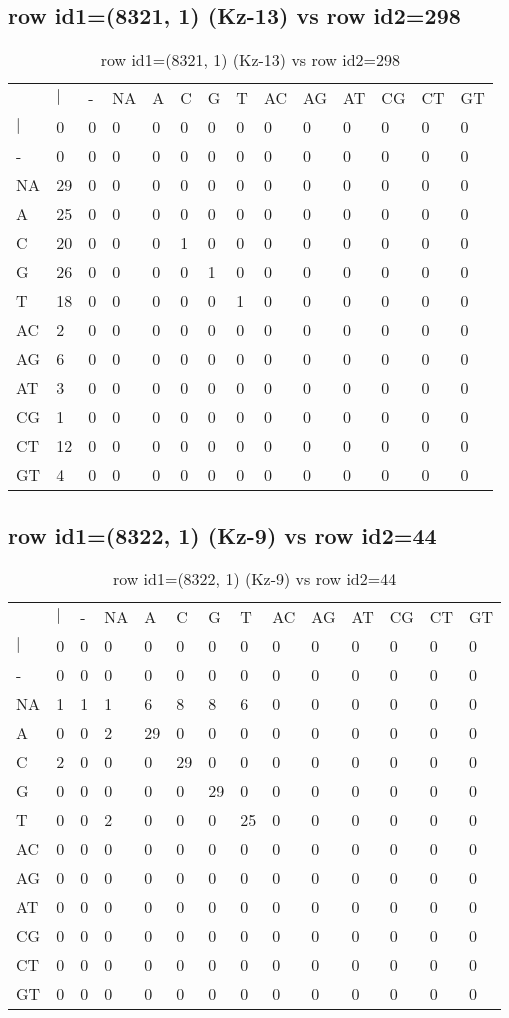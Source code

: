\subsection{row id1=(8321, 1) (Kz-13) vs row id2=298}
\begin{center}
\begin{longtable}{|l|l|l|l|l|l|l|l|l|l|l|l|l|l|}
\caption{row id1=(8321, 1) (Kz-13) vs row id2=298} \label{table_dm320}\\
\hline
\\
\hline
&$|$&-&NA&A&C&G&T&AC&AG&AT&CG&CT&GT\\
$|$&0&0&0&0&0&0&0&0&0&0&0&0&0\\
-&0&0&0&0&0&0&0&0&0&0&0&0&0\\
NA&29&0&0&0&0&0&0&0&0&0&0&0&0\\
A&25&0&0&0&0&0&0&0&0&0&0&0&0\\
C&20&0&0&0&1&0&0&0&0&0&0&0&0\\
G&26&0&0&0&0&1&0&0&0&0&0&0&0\\
T&18&0&0&0&0&0&1&0&0&0&0&0&0\\
AC&2&0&0&0&0&0&0&0&0&0&0&0&0\\
AG&6&0&0&0&0&0&0&0&0&0&0&0&0\\
AT&3&0&0&0&0&0&0&0&0&0&0&0&0\\
CG&1&0&0&0&0&0&0&0&0&0&0&0&0\\
CT&12&0&0&0&0&0&0&0&0&0&0&0&0\\
GT&4&0&0&0&0&0&0&0&0&0&0&0&0\\
\hline
\end{longtable}
\end{center}

\subsection{row id1=(8322, 1) (Kz-9) vs row id2=44}
\begin{center}
\begin{longtable}{|l|l|l|l|l|l|l|l|l|l|l|l|l|l|}
\caption{row id1=(8322, 1) (Kz-9) vs row id2=44} \label{table_dm322}\\
\hline
\\
\hline
&$|$&-&NA&A&C&G&T&AC&AG&AT&CG&CT&GT\\
$|$&0&0&0&0&0&0&0&0&0&0&0&0&0\\
-&0&0&0&0&0&0&0&0&0&0&0&0&0\\
NA&1&1&1&6&8&8&6&0&0&0&0&0&0\\
A&0&0&2&29&0&0&0&0&0&0&0&0&0\\
C&2&0&0&0&29&0&0&0&0&0&0&0&0\\
G&0&0&0&0&0&29&0&0&0&0&0&0&0\\
T&0&0&2&0&0&0&25&0&0&0&0&0&0\\
AC&0&0&0&0&0&0&0&0&0&0&0&0&0\\
AG&0&0&0&0&0&0&0&0&0&0&0&0&0\\
AT&0&0&0&0&0&0&0&0&0&0&0&0&0\\
CG&0&0&0&0&0&0&0&0&0&0&0&0&0\\
CT&0&0&0&0&0&0&0&0&0&0&0&0&0\\
GT&0&0&0&0&0&0&0&0&0&0&0&0&0\\
\hline
\end{longtable}
\end{center}

